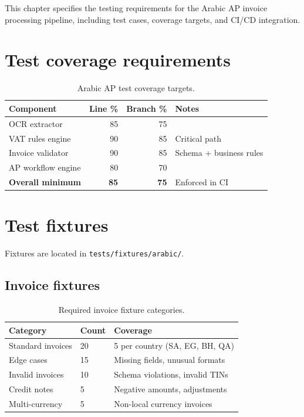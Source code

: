\documentclass[11pt,a4paper,twoside]{report}
\begin{document}
This chapter specifies the testing requirements for the Arabic AP invoice
processing pipeline, including test cases, coverage targets, and CI/CD
integration.

\section{Test coverage requirements}

\begin{table}[htbp]
\centering
\caption{Arabic AP test coverage targets.}
\label{tab:arabic-coverage}
\footnotesize
\begin{tabularx}{\linewidth}{@{}l r r X@{}}
\toprule
\textbf{Component} & \textbf{Line \%} & \textbf{Branch \%} & \textbf{Notes} \\ \midrule
OCR extractor & 85 & 75 & \\
VAT rules engine & 90 & 85 & Critical path \\
Invoice validator & 90 & 85 & Schema + business rules \\
AP workflow engine & 80 & 70 & \\
\textbf{Overall minimum} & \textbf{85} & \textbf{75} & Enforced in CI \\
\bottomrule
\end{tabularx}
\end{table}

\section{Test fixtures}

Fixtures are located in \texttt{tests/fixtures/arabic/}.

\subsection{Invoice fixtures}

\begin{table}[htbp]
\centering
\caption{Required invoice fixture categories.}
\footnotesize
\begin{tabularx}{\linewidth}{@{}l l X@{}}
\toprule
\textbf{Category} & \textbf{Count} & \textbf{Coverage} \\ \midrule
Standard invoices & 20 & 5 per country (SA, EG, BH, QA) \\
Edge cases & 15 & Missing fields, unusual formats \\
Invalid invoices & 10 & Schema violations, invalid TINs \\
Credit notes & 5 & Negative amounts, adjustments \\
Multi-currency & 5 & Non-local currency invoices \\
\bottomrule
\end{tabularx}
\end{table}
\end{document}
